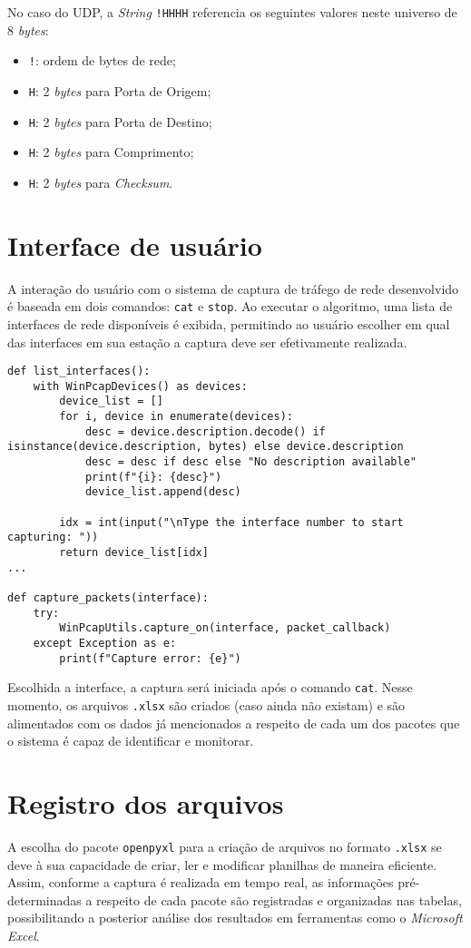 \documentclass[12pt]{article}
\begin{document}
\quad No caso do UDP, a \emph{String} \texttt{!HHHH} referencia os seguintes valores neste universo de 8 \emph{bytes}:

\begin{itemize}
    \item \texttt{!}: ordem de bytes de rede;
    \item \texttt{H}: 2 \emph{bytes} para Porta de Origem;
    \item \texttt{H}: 2 \emph{bytes} para Porta de Destino;
    \item \texttt{H}: 2 \emph{bytes} para Comprimento;
    \item \texttt{H}: 2 \emph{bytes} para \emph{Checksum}.
\end{itemize}

\section{Interface de usuário}
A interação do usuário com o sistema de captura de tráfego de rede desenvolvido é baseada em dois comandos: \texttt{cat} e \texttt{stop}. Ao executar o algoritmo, uma lista de interfaces de rede disponíveis é exibida, permitindo ao usuário escolher em qual das interfaces em sua estação a captura deve ser efetivamente realizada.

\begin{lstlisting}[style=vscode]
def list_interfaces():
    with WinPcapDevices() as devices:
        device_list = []
        for i, device in enumerate(devices):
            desc = device.description.decode() if isinstance(device.description, bytes) else device.description
            desc = desc if desc else "No description available"
            print(f"{i}: {desc}")
            device_list.append(desc)

        idx = int(input("\nType the interface number to start capturing: "))
        return device_list[idx]
...

def capture_packets(interface):
    try:
        WinPcapUtils.capture_on(interface, packet_callback)
    except Exception as e:
        print(f"Capture error: {e}")
\end{lstlisting}

\quad Escolhida a interface, a captura será iniciada após o comando \texttt{cat}. Nesse momento, os arquivos \texttt{.xlsx} são criados (caso ainda não existam) e são alimentados com os dados já mencionados a respeito de cada um dos pacotes que o sistema é capaz de identificar e monitorar.

\section{Registro dos arquivos}
A escolha do pacote \texttt{openpyxl} para a criação de arquivos no formato \texttt{.xlsx} se deve à sua capacidade de criar, ler e modificar planilhas de maneira eficiente. Assim, conforme a captura é realizada em tempo real, as informações pré-determinadas a respeito de cada pacote são registradas e organizadas nas tabelas, possibilitando a posterior análise dos resultados em ferramentas como o \emph{Microsoft Excel}.
\end{document}
